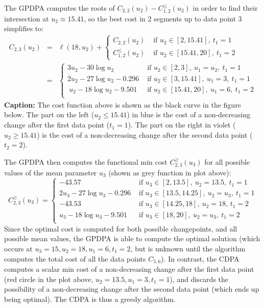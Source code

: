 \documentclass{article}
\begin{document}
\newpage


The GPDPA computes the roots of $C_{2,2}(u_2)-C^\leq_{1,2}(u_2)$ in
order to find their intersection at $u_2\approx15.41$, so the best
cost in 2 segments up to data point 3 simplifies to:
\begin{eqnarray}
C_{2,3}(u_2)  &=&\ell(18, u_2) + 
                \begin{cases}
                  C_{2,2}(u_2) & \text{ if }u_2\in[2, 15.41],\ t_1=1\\
                  C^\leq_{1,2}(u_2)& \text{ if }u_2\in[15.41, 20],\ t_1=2
                \end{cases}\\
            &=&
                \begin{cases}
                  3u_2 -30 \log u_2 & \text{ if } u_2\in[2,3],\ u_1=u_2,\ t_1=1\\
                  2u_2 -27 \log u_2 -0.296 & \text{ if } u_2\in[3, 15.41],\ u_1=3,\ t_1=1\\\
                  u_2 -18 \log u_2 -9.501  & \text{ if } u_2\in[15.41, 20],\ u_1=6,\ t_1=2\\
                \end{cases}
\end{eqnarray}
\textbf{Caption:} The cost function above
is shown as the black curve in the figure
below. The part on the left ($u_2\leq 15.41$) in blue is the cost of a
non-decreasing change after the first data point ($t_1=1$). The part
on the right in violet ($u_2\geq 15.41$) is the cost of a
non-decreasing change after the second data point ($t_2=2$). 



The GPDPA then computes the functional min cost $C^\geq_{2,3}(u_3)$ for all
possible values of the mean parameter $u_3$ (shown as grey function in plot
above):
\begin{equation}
C^\geq_{2,3}(u_3)  =
\begin{cases}
  -43.57 & \text{ if } u_3\in[2, 13.5],\ u_2=13.5,\ t_1=1\\
  2u_3 -27 \log u_3 -0.296 & \text{ if } u_3\in[13.5, 14.25],\ u_2=u_3,\ t_1=1\\
  -43.53 & \text{ if } u_3\in[14.25, 18],\ u_2=18,\, t_1=2\\
  u_3 -18 \log u_3 -9.501  & \text{ if } u_3\in[18, 20],\ u_2=u_3,\ t_1=2\\
\end{cases}
\end{equation}
Since the optimal cost is computed for both possible changepoints, and
all possible mean values, the GPDPA is able to compute the optimal
solution (which occurs at $u_3=15, u_2=18, u_1=6, t_1=2$, but is
unknown until the algorithm computes the total cost of all the data
points $C_{5,6}$). In contrast, the CDPA computes a scalar min cost of
a non-decreasing change after the first data point (red circle in the
plot above, $u_2=13.5, u_1=3, t_1=1$), and discards the possibility of
a non-decreasing change after the second data point (which ends up
being optimal). The CDPA is thus a greedy algorithm.
\end{document}
